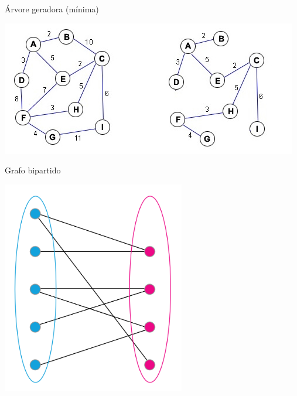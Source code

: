 \documentclass[compress,mathserif]{beamer}
\begin{document}

\begin{frame}{Árvore geradora (mínima)}

\vspace{0.5cm}

\centering \includegraphics[width=\textwidth]{images/agm.jpg}

\end{frame}


\begin{frame}{Grafo bipartido}

\vspace{0.5cm}

\centering \includegraphics[width=0.6\textwidth]{images/bipartido.png}

\end{frame}

\end{document}
